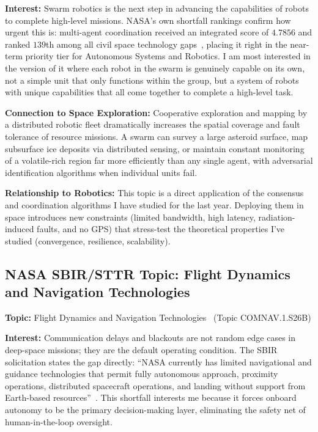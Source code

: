 \documentclass[11pt]{article}
\begin{document}
\textbf{Interest:} Swarm robotics is the next step in advancing the capabilities of
robots to complete high-level missions. NASA's own shortfall rankings confirm how urgent this is:
multi-agent coordination received an integrated score of $4.7856$ and ranked $139$th among all
civil space technology gaps~\cite{stmdShortfall}, placing it right in the near-term priority tier
for Autonomous Systems and Robotics. I am most interested in the version of it where each robot
in the swarm is genuinely capable on its own, not a simple unit that only functions within the
group, but a system of robots with unique capabilities that all come together to complete a
high-level task.

\textbf{Connection to Space Exploration:} Cooperative exploration and mapping by a
distributed robotic fleet dramatically increases the spatial coverage and fault tolerance of
resource missions. A swarm can survey a large asteroid surface, map subsurface ice deposits via
distributed sensing, or maintain constant monitoring of a volatile-rich region far more
efficiently than any single agent, with adversarial identification algorithms when individual
units fail.

\textbf{Relationship to Robotics:} This topic is a direct application of the consensus
and coordination algorithms I have studied for the last year. Deploying them in space introduces
new constraints (limited bandwidth, high latency, radiation-induced faults, and no GPS) that
stress-test the theoretical properties I've studied (convergence, resilience, scalability).

\subsection{NASA SBIR/STTR Topic: Flight Dynamics and Navigation Technologies}

\textbf{Topic:} Flight Dynamics and Navigation Technologies~\cite{nasaSBIR} (Topic
COMNAV.1.S26B)

\textbf{Interest:} Communication delays and blackouts are not random edge cases in
deep-space missions; they are the default operating condition. The SBIR solicitation states the
gap directly: ``NASA currently has limited navigational and guidance technologies that permit
fully autonomous approach, proximity operations, distributed spacecraft operations, and landing
without support from Earth-based resources''~\cite{nasaSBIR}. This shortfall interests me because
it forces onboard autonomy to be the primary decision-making layer, eliminating the safety net of
human-in-the-loop oversight.
\end{document}
